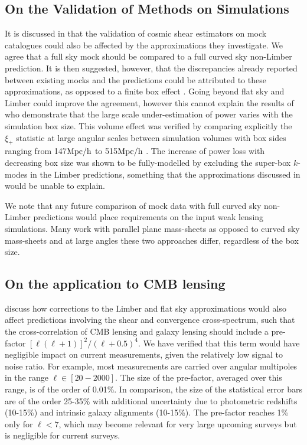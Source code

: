 \subsection{On the Validation of Methods on Simulations}
It is discussed in \citet{kitching/etal:2016} that the validation of cosmic shear estimators on mock catalogues could also be affected by the approximations they investigate.  We agree that a full sky mock should be compared to a full curved sky non-Limber prediction.  It is then suggested, however, that the discrepancies already reported between existing mocks and the predictions could be attributed to these approximations, as opposed to a finite box effect \citep{kiessling/etal:2011, harnois-deraps/etal:2012, harnois-deraps/vanwaerbeke:2015}.  Going beyond flat sky and Limber could improve the agreement, however this cannot explain the results of \citet{harnois-deraps/vanwaerbeke:2015} who demonstrate that the large scale under-estimation of power varies with the simulation box size. This volume effect was verified by comparing explicitly the $\xi_+$ statistic at large angular scales between simulation volumes with box sides  ranging from 147$\rm{Mpc/h}$ to 515$\rm{Mpc/h}$ \citep[see Fig. 5 in][]{harnois-deraps/vanwaerbeke:2015}. The increase of power loss with decreasing box size was shown to be fully-modelled by excluding the super-box $k$-modes in the Limber predictions, something that the approximations discussed in \citet{kitching/etal:2016} would be unable to explain.

We note that any future comparison of mock data with full curved sky non-Limber predictions would place requirements on the input weak lensing simulations.  Many work with parallel plane mass-sheets as opposed to curved sky mass-sheets and at large angles these two approaches differ, regardless of the box size. 

\subsection{On the application to CMB lensing}
\citet{kitching/etal:2016} discuss how corrections to the Limber and flat sky approximations would also affect predictions involving the shear and convergence cross-spectrum, such that the cross-correlation of CMB lensing and galaxy lensing should include a pre-factor $ [\ell(\ell+1)]^2/(\ell+ 0.5)^4$.   We have verified that this term would have negligible impact on current measurements, given the relatively low signal to noise ratio.  For example, most measurements \citep{hand/etal:2015, liu/hill:2015, kirk/etal:2016,harnois-deraps/etal:2016} are carried over angular multipoles in the range $\ell \in [20-2000]$.  The size of the pre-factor, averaged over this range, is of the order of 0.01\%. In comparison, the size of the statistical error bars are of the order 25-35\% with additional uncertainty due to photometric redshifts (10-15\%) and intrinsic galaxy alignments (10-15\%). The pre-factor reaches 1\% only for $\ell < 7$, which may become relevant for very large upcoming surveys but is negligible for current surveys. 

